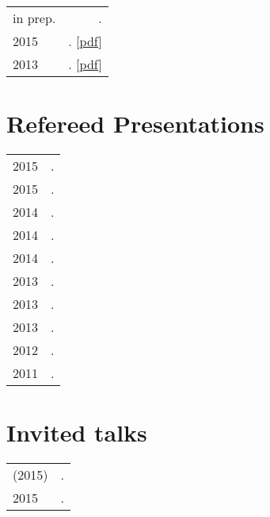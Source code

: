 \documentclass[11pt,letterpaper,twoside]{article}
\makeatletter
\newcommand{\myvrule}{\color{lightgray}\vrule width 1.0pt}
\newenvironment{cvsection}{%
  \renewcommand{\arraystretch}{1.75}
  \begin{longtable}[l]{@{} L R @{}}
}{%
  \end{longtable}
}
\makeatother
\begin{document}
\begin{cvsection}
  in prep. & \null{}. \\

  2015 & \null{}.
  [\href{http://people.linguistics.mcgill.ca/~brian.buccola/files/buccola2015nels45.pdf}{pdf}] \\

  2013 & \null{}.
  [\href{http://people.linguistics.mcgill.ca/~brian.buccola/files/buccola2013fg.pdf}{pdf}] \\
\end{cvsection}

\section*{Refereed Presentations}

\begin{cvsection}
  2015 & \null{}. \\
  2015 & \null{}. \\
  2014 & \null{}. \\
  2014 & \null{}. \\
  2014 & \null{}. \\
  2013 & \null{}. \\
  2013 & \null{}. \\
  2013 & \null{}. \\
  2012 & \null{}. \\
  2011 & \null{}. \\
\end{cvsection}

\section*{Invited talks}

\begin{cvsection}
  (2015) & \null{}. \\
  2015 & \null{}. \\
\end{cvsection}
\end{document}

